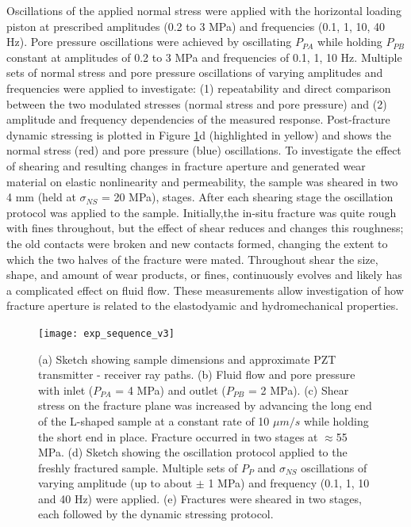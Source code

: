 \documentclass[draft]{agujournal2019}
\begin{document}
Oscillations of the applied normal stress were applied with the horizontal loading piston at prescribed amplitudes (0.2 to 3 MPa) and frequencies (0.1, 1, 10, 40 Hz). Pore pressure oscillations were achieved by oscillating $P_{PA}$ while holding $P_{PB}$ constant at amplitudes of 0.2 to 3 MPa and frequencies of 0.1, 1, 10 Hz. Multiple sets of normal stress and pore pressure oscillations of varying amplitudes and frequencies were applied to investigate: (1) repeatability and direct comparison between the two modulated stresses (normal stress and pore pressure) and (2) amplitude and frequency dependencies of the measured response. Post-fracture dynamic stressing is plotted in Figure \ref{fig:exp_seq}d (highlighted in yellow) and shows the normal stress (red) and pore pressure (blue) oscillations.
To investigate the effect of shearing and resulting changes in fracture aperture and generated wear material on elastic nonlinearity and permeability, the sample was sheared in two 4 mm (held at $ \sigma_{NS} $ = 20 MPa), stages. After each shearing stage the oscillation protocol was applied to the sample. Initially,the in-situ fracture was quite rough with fines throughout, but the effect of shear reduces and changes this roughness; the old contacts were broken and new contacts formed, changing the extent to which the two halves of the fracture were mated. Throughout shear the size, shape, and amount of wear products, or fines, continuously evolves and likely has a complicated effect on fluid flow. These measurements allow investigation of how fracture aperture is related to the elastodyamic and hydromechanical properties.

\newpage


\begin{figure}[ht]
	\centering
	\texttt{[image: exp\_sequence\_v3]}
	\caption[]{(a) Sketch showing sample dimensions and approximate PZT transmitter - receiver ray paths.
		(b) Fluid flow and pore pressure with inlet ($P_{PA}$ = 4 MPa) and outlet ($P_{PB}$ = 2 MPa).
		(c) Shear stress on the fracture plane was increased by advancing the long end of the L-shaped sample at a constant rate of 10 $\mu m/s$ while holding the short end in place. Fracture occurred in two stages at $ \approx $55 MPa.
		(d) Sketch showing the oscillation protocol applied to the freshly fractured sample. Multiple sets of $P_{P}$ and $ \sigma_{NS} $ oscillations of varying amplitude (up to about $ \pm $ 1 MPa) and frequency (0.1, 1, 10 and 40 Hz) were applied.
		(e) Fractures were sheared in two stages, each followed by the dynamic stressing protocol.}
	\label{fig:exp_seq}
\end{figure}
\end{document}
